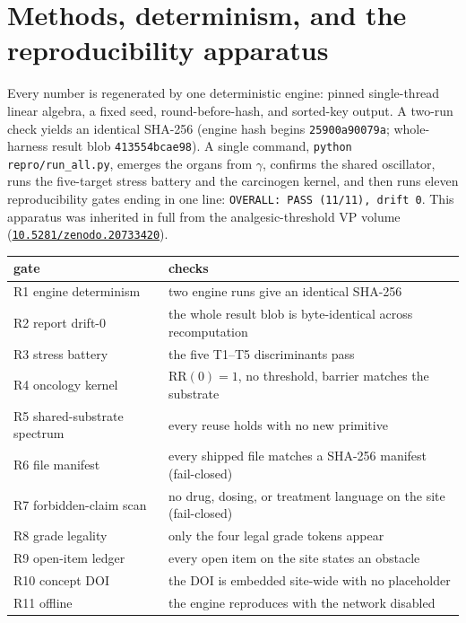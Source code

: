 \documentclass[11pt]{article}
\newcommand{\reprodoi}{10.5281/zenodo.20733420}
\begin{document}
\section{Methods, determinism, and the reproducibility apparatus}

Every number is regenerated by one deterministic engine: pinned single-thread linear algebra, a fixed
seed, round-before-hash, and sorted-key output. A two-run check yields an identical SHA-256 (engine
hash begins \texttt{25900a90079a}; whole-harness result blob \texttt{413554bcae98}). A single command,
\texttt{python repro/run\_all.py}, emerges the organs from $\gamma$, confirms the shared oscillator,
runs the five-target stress battery and the carcinogen kernel, and then runs eleven reproducibility
gates ending in one line: \texttt{OVERALL: PASS (11/11), drift 0}. This apparatus was inherited in full
from the analgesic-threshold VP volume
(\href{https://doi.org/10.5281/zenodo.20733420}{\texttt{\reprodoi}}).

\begin{center}
\begin{tabular}{@{}ll@{}}
\toprule
gate & checks\\
\midrule
R1 engine determinism & two engine runs give an identical SHA-256\\
R2 report drift-$0$ & the whole result blob is byte-identical across recomputation\\
R3 stress battery & the five T1--T5 discriminants pass\\
R4 oncology kernel & $\mathrm{RR}(0)=1$, no threshold, barrier matches the substrate\\
R5 shared-substrate spectrum & every reuse holds with no new primitive\\
R6 file manifest & every shipped file matches a SHA-256 manifest (fail-closed)\\
R7 forbidden-claim scan & no drug, dosing, or treatment language on the site (fail-closed)\\
R8 grade legality & only the four legal grade tokens appear\\
R9 open-item ledger & every open item on the site states an obstacle\\
R10 concept DOI & the DOI is embedded site-wide with no placeholder\\
R11 offline & the engine reproduces with the network disabled\\
\bottomrule
\end{tabular}
\end{center}
\end{document}
